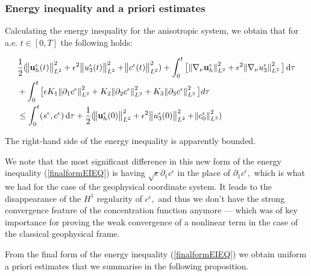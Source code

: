 \documentclass[12pt]{report}
\numberwithin{theorem}{chapter}
\numberwithin{corollary}{chapter}
\numberwithin{lemma}{chapter}
\numberwithin{remark}{chapter}
\numberwithin{definition}{chapter}
\numberwithin{prop}{chapter}
\newcommand*\diff{\mathop{}\!\mathrm{d}}
\begin{document}
  \subsubsection{Energy inequality and a priori estimates}
  
Calculating the energy inequality for the anisotropic system, we obtain that for a.e. $t \in [0,T]$ the following holds:
  
  \begin{equation}
    \begin{split}  
    & \frac{1}{2} (\norm{\mathbf{u}_h^\epsilon (t)}_{L^2}^2 + \epsilon ^ 2 \norm{u_3^\epsilon (t)}_{L^2}^2 + \norm{c^\epsilon (t)}_{L^2}^2) + \int_0 ^ t \big[ \norm{\nabla_\nu \mathbf{u}_h^\epsilon}_{L^2}^2 + \epsilon ^ 2 \norm{\nabla_\nu u_3^\epsilon}_{L^2}^2  \big] \diff \tau \\
    & + \int_0 ^ t  \big [ \epsilon K_1 \norm{\partial_1 c^\epsilon}_{L^2}^2  + K_2 \norm{\partial_2 c^\epsilon}_{L^2}^2 + K_3 \norm{\partial_3 c^\epsilon}_{L^2}^2 \big ] d \tau \\
    & \leq \int_0^t (s^\epsilon,c^\epsilon) \diff \tau + \frac{1}{2} (\norm{\mathbf{u}_h^\epsilon (0)}_{L^2}^2 + \epsilon ^ 2 \norm{u_3^\epsilon (0)}_{L^2}^2 + \norm{c^\epsilon_0}_{L^2}^2) \raisetag{50pt} \label{finalformEIEQ}
    \end{split}
  \end{equation}
    
  The right-hand side of the energy inequality is apparently bounded.
  
  We note that the most significant difference in this new form of the energy inequality (\ref{finalformEIEQ}) is having $\sqrt{\epsilon} \partial_1 c^\epsilon$ in the place of $\partial_1 c^\epsilon,$ which is what we had for the case of the geophysical coordinate system. It leads to the disappearance of the $H^1$ regularity of $c^\epsilon,$ and thus we don't have the strong convergence feature of the concentration function anymore --- which was of key importance for proving the weak convergence of a nonlinear term in the case of the classical geophysical frame.
  
  From the final form of the energy inequality (\ref{finalformEIEQ}) we obtain uniform a priori estimates that we summarise in the following proposition.
  
\end{document}

